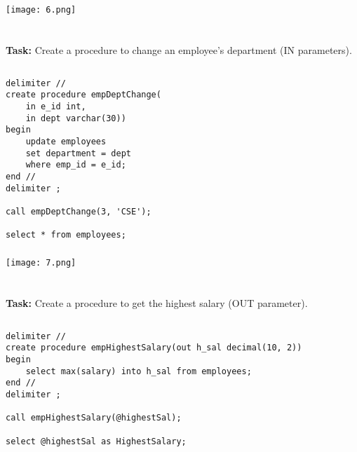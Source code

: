 \documentclass[12pt,a4paper]{article}
\begin{document}
\subsubsection{}
\begin{center}
    \texttt{[image: 6.png]}
\end{center}


\section{}
\textbf{Task:} Create a procedure to change an employee’s department (IN parameters).

\subsection{}
\begin{lstlisting}
delimiter //
create procedure empDeptChange(
	in e_id int,
    in dept varchar(30))
begin
	update employees
    set department = dept
    where emp_id = e_id;
end //
delimiter ;

call empDeptChange(3, 'CSE');

select * from employees;
\end{lstlisting}

\subsubsection{}
\begin{center}
    \texttt{[image: 7.png]}
\end{center}


\section{}
\textbf{Task:} Create a procedure to get the highest salary (OUT parameter).

\subsection{}
\begin{lstlisting}
delimiter //
create procedure empHighestSalary(out h_sal decimal(10, 2))
begin
	select max(salary) into h_sal from employees;
end //
delimiter ;

call empHighestSalary(@highestSal);

select @highestSal as HighestSalary;
\end{lstlisting}
\end{document}
